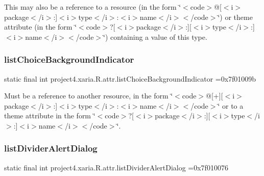 This may also be a reference to a resource (in the form \char`\"{}$<$code$>$@\mbox{[}$<$i$>$package$<$/i$>$\+:\mbox{]}$<$i$>$type$<$/i$>$\+:$<$i$>$name$<$/i$>$$<$/code$>$\char`\"{}) or theme attribute (in the form \char`\"{}$<$code$>$?\mbox{[}$<$i$>$package$<$/i$>$\+:\mbox{]}\mbox{[}$<$i$>$type$<$/i$>$\+:\mbox{]}$<$i$>$name$<$/i$>$$<$/code$>$\char`\"{}) containing a value of this type. \mbox{\label{classproject4_1_1xaria_1_1R_1_1attr_a043b691e2e635971fec9407a85888364}} 
\subsubsection{\texorpdfstring{list\+Choice\+Background\+Indicator}{listChoiceBackgroundIndicator}}
{\footnotesize\ttfamily static final int project4.\+xaria.\+R.\+attr.\+list\+Choice\+Background\+Indicator =0x7f01009b\hspace{0.3cm}{\ttfamily [static]}}

Must be a reference to another resource, in the form \char`\"{}$<$code$>$@\mbox{[}+\mbox{]}\mbox{[}$<$i$>$package$<$/i$>$\+:\mbox{]}$<$i$>$type$<$/i$>$\+:$<$i$>$name$<$/i$>$$<$/code$>$\char`\"{} or to a theme attribute in the form \char`\"{}$<$code$>$?\mbox{[}$<$i$>$package$<$/i$>$\+:\mbox{]}\mbox{[}$<$i$>$type$<$/i$>$\+:\mbox{]}$<$i$>$name$<$/i$>$$<$/code$>$\char`\"{}. \mbox{\label{classproject4_1_1xaria_1_1R_1_1attr_aa4f36f6a7dac944117cabb85c635b34d}} 
\subsubsection{\texorpdfstring{list\+Divider\+Alert\+Dialog}{listDividerAlertDialog}}
{\footnotesize\ttfamily static final int project4.\+xaria.\+R.\+attr.\+list\+Divider\+Alert\+Dialog =0x7f010076\hspace{0.3cm}{\ttfamily [static]}}

